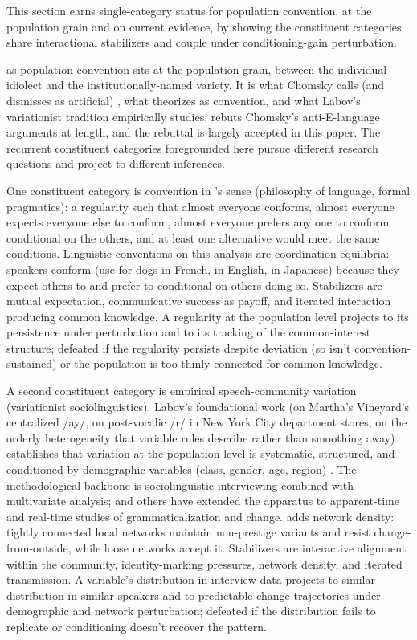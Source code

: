 \documentclass[12pt]{article}
\begin{document}
This section earns single-category status for population convention, at the population grain and on current evidence, by showing the constituent categories share interactional stabilizers and couple under conditioning-gain perturbation.

 as population convention sits at the population grain, between the individual idiolect and the institutionally-named variety. It is what Chomsky calls (and dismisses as artificial) , what \textcite{lewis1969} theorizes as convention, and what Labov's variationist tradition empirically studies. \textcite{santana2016language} rebuts Chomsky's anti-E-language arguments at length, and the rebuttal is largely accepted in this paper. The recurrent constituent categories foregrounded here pursue different research questions and project to different inferences.

One constituent category is convention in \citeauthor{lewis1969}'s sense (philosophy of language, formal pragmatics): a regularity such that almost everyone conforms, almost everyone expects everyone else to conform, almost everyone prefers any one to conform conditional on the others, and at least one alternative would meet the same conditions. Linguistic conventions on this analysis are coordination equilibria: speakers conform (use  for dogs in French,  in English,  in Japanese) because they expect others to and prefer to conditional on others doing so. Stabilizers are mutual expectation, communicative success as payoff, and iterated interaction producing common knowledge. A regularity at the population level projects to its persistence under perturbation and to its tracking of the common-interest structure; defeated if the regularity persists despite deviation (so isn't convention-sustained) or the population is too thinly connected for common knowledge.

A second constituent category is empirical speech-community variation (variationist sociolinguistics). Labov's foundational work (on Martha's Vineyard's centralized /ay/, on post-vocalic /r/ in New York City department stores, on the orderly heterogeneity that variable rules describe rather than smoothing away) establishes that variation at the population level is systematic, structured, and conditioned by demographic variables (class, gender, age, region) \citep{labov1972, labov2001}. The methodological backbone is sociolinguistic interviewing combined with multivariate analysis; \textcite{tagliamontedarcy2007} and others have extended the apparatus to apparent-time and real-time studies of grammaticalization and change. \textcite{milroy1987} adds network density: tightly connected local networks maintain non-prestige variants and resist change-from-outside, while loose networks accept it. Stabilizers are interactive alignment within the community, identity-marking pressures, network density, and iterated transmission. A variable's distribution in interview data projects to similar distribution in similar speakers and to predictable change trajectories under demographic and network perturbation; defeated if the distribution fails to replicate or conditioning doesn't recover the pattern.
\end{document}
